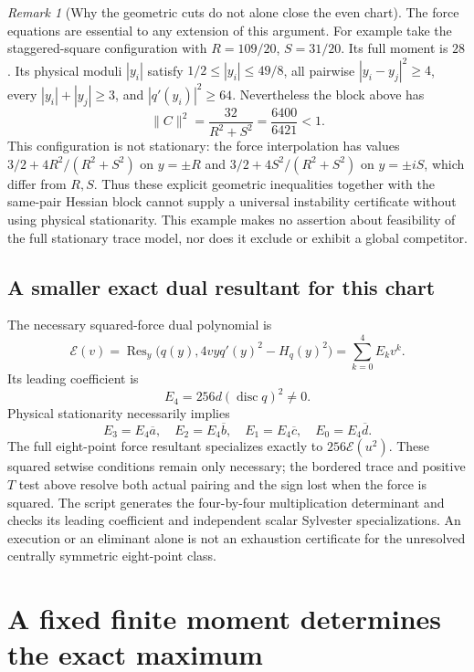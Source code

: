 \documentclass[11pt]{article}
\theoremstyle{remark}
\newtheorem{remark}[theorem]{Remark}
\numberwithin{equation}{section}
\begin{document}
\begin{remark}[Why the geometric cuts do not alone close the even chart]
The force equations are essential to any extension of this argument.
For example take the staggered-square configuration with
$R=109/20$, $S=31/20$. Its full moment is $28$. Its physical moduli
$|y_i|$ satisfy $1/2\le |y_i|\le49/8$, all pairwise
$|y_i-y_j|^2\ge4$, every $|y_i|+|y_j|\ge3$, and
$|q'(y_i)|^2\ge64$. Nevertheless the block above has
\[
 \|C\|^2=\frac{32}{R^2+S^2}=\frac{6400}{6421}<1.
\]
This configuration is not stationary: the force interpolation has
values $3/2+4R^2/(R^2+S^2)$ on $y=\pm R$ and
$3/2+4S^2/(R^2+S^2)$ on $y=\pm iS$, which differ from $R,S$.
Thus these explicit geometric inequalities together with the
same-pair Hessian block cannot supply a universal instability
certificate without using physical stationarity. This example makes
no assertion about feasibility of the full stationary trace model,
nor does it exclude or exhibit a global competitor.
\end{remark}

\subsection{A smaller exact dual resultant for this chart}
The necessary squared-force dual polynomial is
\[
 \mathcal E(v)=\operatorname{Res}_y
 \bigl(q(y),4vyq'(y)^2-H_q(y)^2\bigr)=\sum_{k=0}^4E_kv^k.
\]
Its leading coefficient is
\[
                     E_4=256d(\operatorname{disc}q)^2\ne0.
\]
Physical stationarity necessarily implies
\[
 E_3=E_4\overline a,\quad E_2=E_4\overline b,\quad
 E_1=E_4\overline c,\quad E_0=E_4\overline d.
\]
The full eight-point force resultant specializes exactly to
$256\mathcal E(u^2)$. These squared setwise conditions remain only
necessary; the bordered trace and positive $T$ test above resolve
both actual pairing and the sign lost when the force is squared.
The script  generates the
four-by-four multiplication determinant and checks its leading
coefficient and independent scalar Sylvester specializations.
An execution or an eliminant alone is not an exhaustion certificate
for the unresolved centrally symmetric eight-point class.

\section{A fixed finite moment determines the exact maximum}
\label{sec:fixed-moment-reconstruction}
\end{document}

